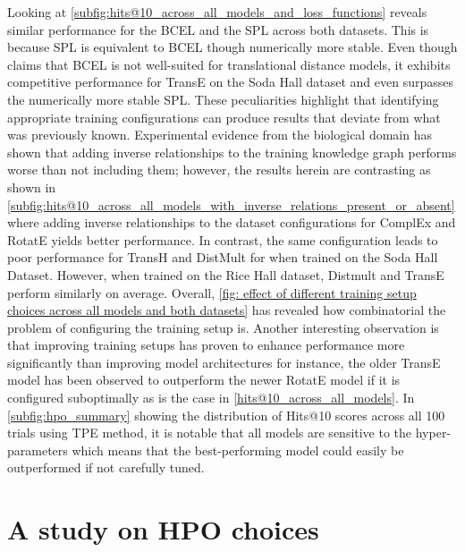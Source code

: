 Looking at \autoref{subfig:hits@10_across_all_models_and_loss_functions} reveals similar performance for the \ac{BCEL} and the \ac{SPL} across both datasets. This is because \ac{SPL} is equivalent to \ac{BCEL} though numerically more stable. Even though \citep{Ali2020BringingFramework} claims that \ac{BCEL} is not well-suited for translational distance models, it exhibits competitive performance for TransE on the Soda Hall dataset and even surpasses the numerically more stable \ac{SPL}. These peculiarities highlight that identifying appropriate training configurations can produce results that deviate from what was previously known. Experimental evidence from the biological domain has shown that adding inverse relationships to the training knowledge graph performs worse than not including them; however, the results herein are contrasting as shown in \autoref{subfig:hits@10_across_all_models_with_inverse_relations_present_or_absent} where adding inverse relationships to the dataset configurations for ComplEx and RotatE yields better performance. In contrast, the same configuration leads to poor performance for TransH and DistMult for when trained on the Soda Hall Dataset. However, when trained on the Rice Hall dataset, Distmult and TransE perform similarly on average. Overall, \autoref{fig: effect of different training setup choices across all models and both datasets} has revealed how combinatorial the problem of configuring the training setup is. Another interesting observation is that improving training setups has proven to enhance performance more significantly than improving model architectures for instance, the older TransE model has been observed to outperform the newer RotatE model if it is configured suboptimally as is the case in \autoref{hits@10_across_all_models}. In \autoref{subfig:hpo_summary} showing the distribution of Hits@10 scores across all 100 trials using \ac{TPE} method, it is notable that all models are sensitive to the hyper-parameters which means that the best-performing model could easily be outperformed if not carefully tuned. 

\section{A study on \ac{HPO} choices}\label{sec: training setup choices}

